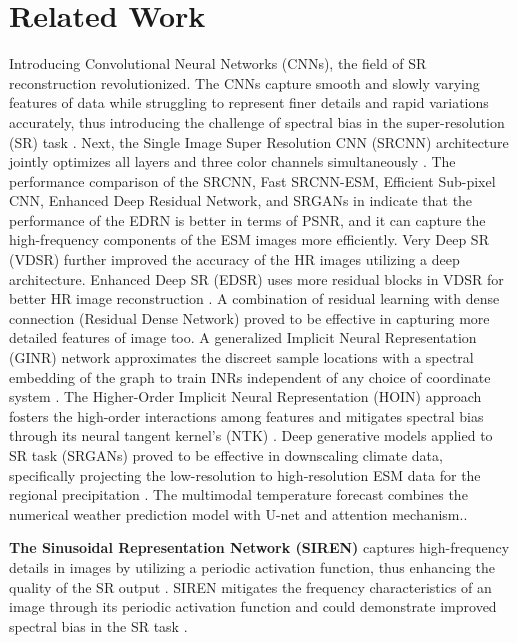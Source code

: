 \documentclass[pdflatex,sn-mathphys-num]{sn-jnl}%
\begin{document}
\section{Related Work}
\label{sec-related}
Introducing Convolutional Neural Networks (CNNs), the field of SR reconstruction revolutionized\cite{Dong2016}. The CNNs capture smooth and slowly varying features of data while struggling to represent finer details and rapid variations accurately, thus introducing the challenge of spectral bias in the super-resolution (SR) task \cite{Zhang2019}. Next, the Single Image Super Resolution CNN (SRCNN) architecture jointly optimizes all layers and three color channels simultaneously \cite{Dong2016}. The performance comparison of the SRCNN, Fast SRCNN-ESM, Efficient Sub-pixel CNN, Enhanced Deep Residual Network, and SRGANs in \cite{Nikhil2024} indicate that the performance of the EDRN is better in terms of PSNR, and it can capture the high-frequency components of the ESM images more efficiently. Very Deep SR (VDSR) further improved the accuracy of the HR images utilizing a deep architecture\cite{Kim2016VDSR}. Enhanced Deep SR (EDSR) uses more residual blocks in VDSR for better HR image reconstruction \cite{Kim2016EDSR}. A combination of residual learning with dense connection (Residual Dense Network) proved to be effective in capturing more detailed features of image too\cite{Zhang2018}. A generalized Implicit Neural Representation (GINR) network approximates the discreet sample locations with a spectral embedding of the graph to train INRs independent of any choice of coordinate system \cite{grattarola2022ginr}. The Higher-Order Implicit Neural Representation (HOIN) approach fosters the high-order interactions among features and mitigates spectral bias through its neural tangent kernel's (NTK) \cite{chen2024hoin}. Deep generative models applied to SR task (SRGANs) proved to be effective in downscaling climate data, specifically projecting the low-resolution to high-resolution ESM data for the regional precipitation \cite{shidqi2023}. The multimodal temperature forecast combines the numerical weather prediction model with U-net and attention mechanism.\cite{Ding2024}.

\noindent \textbf{The Sinusoidal Representation Network (SIREN)} captures high-frequency details in images by utilizing a periodic activation function, thus enhancing the quality of the SR output \cite{SIREN}. SIREN mitigates the frequency characteristics of an image through its periodic activation function and could demonstrate improved spectral bias in the SR task \cite{SIREN}. 
\end{document}
